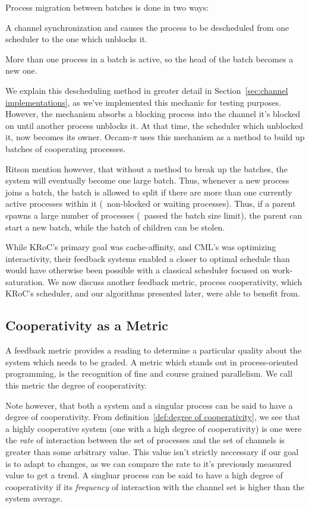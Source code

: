 Process migration between batches is done in two ways: 
\begin{inparaenum}
\item A channel synchronization and causes the process to be descheduled from
one scheduler to the one which unblocks it.
\item More than one process in a batch is active, so the head of the batch
becomes a new one.
\end{inparaenum}
We explain this descheduling method in greater detail in 
Section~\ref{sec:channel implementations}, as we've implemented this mechanic for
testing purposes. However, the mechanism absorbs a blocking process into the 
channel it's blocked on until another process unblocks it. At that time, the
scheduler which unblocked it, now becomes its owner. Occam-$\pi$ uses this 
mechanism as a method to build up batches of cooperating processes.

Ritson \etal mention however, that without a method to break up the batches, the
system will eventually become one large batch. Thus, whenever a new process 
joins a batch, the batch is allowed to split if there are more than one currently
active processes within it (\eg~non-blocked or waiting processes). Thus, if a
parent spawns a large number of processes (\ie~passed the batch size limit), the
parent can start a new batch, while the batch of children can be stolen.

While KRoC's primary goal was cache-affinity, and CML's was optimizing 
interactivity, their feedback systems enabled a closer to optimal schedule than
would have otherwise been possible with a classical scheduler focused on 
work-saturation. We now discuss another feedback metric, process cooperativity, 
which KRoC's scheduler, and our algorithms presented later, were able to 
benefit from.

\subsection{Cooperativity as a Metric}

A feedback metric provides a reading to determine a particular quality about
the system which needs to be graded. A metric which stands out in 
process-oriented programming, is the recognition of fine and course grained 
parallelism. We call this metric the degree of cooperativity.

Note however, that both a system and a singular process can be said to have a 
degree of cooperativity. From definition~\ref{def:degree of cooperativity}, 
we see that
a highly cooperative system (one with a high degree of cooperativity) is one
were the \emph{rate} of interaction between the set of processes and the
set of channels is greater than some arbitrary value. This value isn't 
strictly neccessary if our goal is to adapt to changes, as we can compare the 
rate to it's previously measured value to get a trend. A singluar process can 
be said to have a high degree of cooperativity if its \emph{frequency} of 
interaction with the channel set is higher than the system average. 

